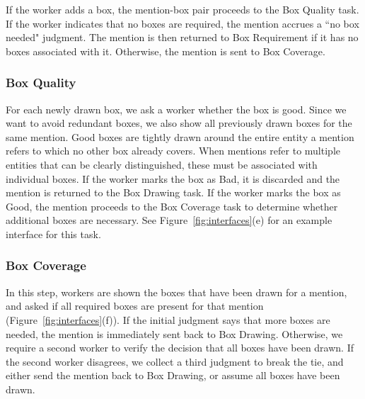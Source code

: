 \documentclass[twocolumn]{svjour3}
\begin{document}
If the worker adds a box, the mention-box pair proceeds to the Box Quality task. If the worker indicates that no boxes are required, the mention accrues a ``no box needed" judgment.  The mention is then returned to Box Requirement if it has no boxes associated with it. Otherwise, the mention is sent to Box Coverage.

\subsubsection{Box Quality}
For each newly drawn box, we ask a worker whether the box is good. Since we want to avoid redundant boxes, we also show all previously drawn boxes for the same mention. Good boxes are tightly drawn around the entire entity a mention refers to which no other box already covers. When mentions refer to multiple entities that can be clearly distinguished, these must be associated with individual boxes. If the worker marks the box as Bad, it is discarded and the mention is returned to the Box Drawing task. If the worker marks the box as Good, the mention proceeds to the Box Coverage task to determine whether additional boxes are necessary. See Figure~\ref{fig:interfaces}(e) for an example interface for this task.



\subsubsection{Box Coverage}
In this step, workers are shown the boxes that have been drawn for a mention, and asked if all required boxes are present for that mention (Figure~\ref{fig:interfaces}(f)). If the initial judgment says that more boxes are needed, the mention is immediately sent back to Box Drawing. Otherwise, we require a second worker to verify the decision that all boxes have been drawn. If the second worker disagrees, we collect a third judgment to break the tie, and either send the mention back to Box Drawing, or assume all boxes have been drawn.
\end{document}
